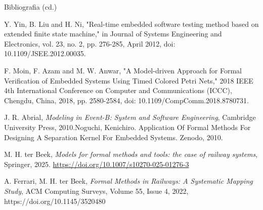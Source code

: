 \documentclass{beamer}
\begin{document}
\begin{frame}{Bibliografia (cd.)}
  \scriptsize
  \begin{thebibliography}{9}
    Y. Yin, B. Liu and H. Ni, "Real-time embedded software testing method based on extended finite state machine," in Journal of Systems Engineering and Electronics, vol. 23, no. 2, pp. 276-285, April 2012, doi: 10.1109/JSEE.2012.00035.
    
    F. Moin, F. Azam and M. W. Anwar, "A Model-driven Approach for Formal Verification of Embedded Systems Using Timed Colored Petri Nets," 2018 IEEE 4th International Conference on Computer and Communications (ICCC), Chengdu, China, 2018, pp. 2580-2584, doi: 10.1109/CompComm.2018.8780731.

    J. R. Abrial, \emph{Modeling in Event-B: System and Software Engineering}, Cambridge University Press, 2010.Noguchi, Kenichiro. Application Of Formal Methods For Designing A Separation Kernel For Embedded Systems. Zenodo, 2010.

    M. H. ter Beek, \emph{Models for formal methods and tools: the case of railway systems}, Springer, 2025.
    \url{https://doi.org/10.1007/s10270-025-01276-3}

    A. Ferrari, M. H. ter Beek, \emph{Formal Methods in Railways: A Systematic Mapping Study}, ACM Computing Surveys, Volume 55, Issue 4, 2022, https://doi.org/10.1145/3520480
  \end{thebibliography}
\end{frame}
\end{document}
